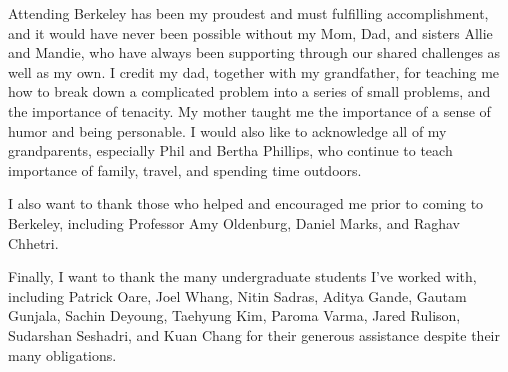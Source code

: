 \documentclass{ucbthesis}
\begin{document}
\begin{frontmatter}
\begin{acknowledgements}
Attending Berkeley has been my proudest and must fulfilling accomplishment, and it would have never been possible without my Mom, Dad, and sisters Allie and Mandie, who have always been supporting through our shared challenges as well as my own. I credit my dad, together with my grandfather, for teaching me how to break down a complicated problem into a series of small problems, and the importance of tenacity. My mother taught me the importance of a sense of humor and being personable. I would also like to acknowledge all of my grandparents, especially Phil and Bertha Phillips, who continue to teach importance of family, travel, and spending time outdoors.

I also want to thank those who helped and encouraged me prior to coming to Berkeley, including Professor Amy Oldenburg, Daniel Marks, and Raghav Chhetri.

Finally, I want to thank the many undergraduate students I've worked with, including Patrick Oare, Joel Whang, Nitin Sadras, Aditya Gande, Gautam Gunjala, Sachin Deyoung, Taehyung Kim, Paroma Varma, Jared Rulison, Sudarshan Seshadri, and Kuan Chang for their generous assistance despite their many obligations.

\end{acknowledgements}

\end{frontmatter}
\pagestyle{headings}









\end{document}
